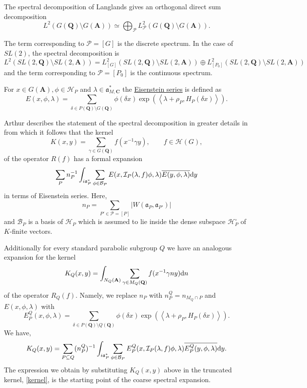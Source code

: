 \documentclass{ims9x6}
\def\A{\mathbf A}
\def\C{\mathbf C}
\def\Q{\mathbf Q}
\def\BBB{\mathcal B}
\def\HHH{\mathcal H}
\def\III{\mathcal I}
\def\PPP{\mathcal P}
\def\aaa{\mathfrak a}
\def\d{\text d}
\def\bs{\setminus}
\def\Ltwo{L^2}
\def\mod#1{\lvert #1 \rvert} %
\def\sprod#1#2{\left\langle #1 , #2 \right\rangle}  %
\begin{document}
The spectral decomposition of Langlands gives an orthogonal direct sum decomposition
\[ \Ltwo(G(\Q)\bs G(\A)) \simeq \bigoplus_{\PPP} \Ltwo_\PPP(G(\Q)\bs G(\A)). \]

The term corresponding to $\PPP = [G]$ is the discrete spectrum. 
In the case of $SL(2)$, the spectral decomposition is 
\[ \Ltwo(SL(2, \Q)\bs SL(2, \A)) = \Ltwo_{[G]} (SL(2, \Q)\bs SL(2, \A)) \oplus \Ltwo_{[P_0]} (SL(2, \Q)\bs SL(2, \A)) \]
and the term corresponding to $\PPP = [P_0]$ is the continuous spectrum.

For $x \in G(\A), \phi \in \HHH_P$ and $\lambda \in \aaa_{M, \C}^*$ the \underline{Eisenstein series} is defined as
\[ E(x, \phi, \lambda) = \sum_{\delta \in P(\Q) \bs G(\Q)} \phi(\delta x) 
		\exp(\sprod{\lambda + \rho_P}{H_P(\delta x)}). \]

Arthur describes the statement of the spectral decomposition in greater details in \cite[Theorem~7.2]{clay} from which it follows that the kernel 
\[ K(x, y) = \sum_{\gamma \in G(\Q)} f(x^{-1}\gamma y) , \qquad f \in \HHH(G),\]
of the operator $R(f)$ has a formal expansion
\[ \sum_{P} n_P^{-1} \int_{i\aaa_P^*} \sum_{\phi \in \BBB_P} E(x, \III_P(\lambda, f)\phi, \lambda) 
		\overline{E(y, \phi, \lambda)} \d y \]
in terms of Eisenstein series. Here, 
\[ n_P = \sum_{P' \in \PPP = [P]} \mod{W(\aaa_P, \aaa_{P'})} \]
and $\BBB_P$ is a basis of $\HHH_P$ which is assumed to lie inside the dense subspace $\HHH_P^\circ$ of $K$-finite vectors. 

Additionally for every standard parabolic subgroup $Q$ we have an analogous expansion for the kernel 
\[ K_Q(x, y) = \int_{N_Q(\A)} \sum_{\gamma \in M_Q(\Q)} f(x^{-1}\gamma n y) \d n \]
of the operator $R_Q(f)$. Namely, we replace $n_P$ with $n_P^Q = n_{M_Q \cap P}$ and $E(x, \phi, \lambda)$ with \[ E_P^Q(x, \phi, \lambda) = \sum_{\delta \in P(\Q) \bs Q(\Q)} \phi(\delta x) \exp(\sprod{\lambda + \rho_P}{H_P(\delta x)}). \]
We have, 
\[ K_Q(x, y) = \sum_{P \subseteq Q} (n_P^Q)^{-1} \int_{i\aaa_P^*} \sum_{\phi \in \BBB_P}
		E_P^Q(x, \III_P(\lambda, f)\phi, \lambda) \overline{E_P^Q(y, \phi, \lambda)} \d y. \]
The expression we obtain by substituting $K_Q(x, y)$ above in the truncated kernel, \cref{kernel}, is the starting point of the coarse spectral expansion. 
\end{document}
